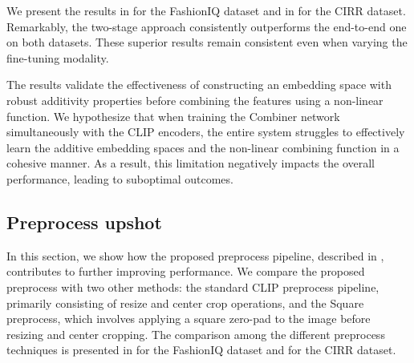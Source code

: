 \documentclass[acmlarge]{acmart}
\begin{document}
We present the results in  for the FashionIQ dataset and in  for the CIRR dataset. Remarkably, the two-stage approach consistently outperforms the end-to-end one on both datasets. These superior results remain consistent even when varying the fine-tuning modality.

The results validate the effectiveness of constructing an embedding space with robust additivity properties before combining the features using a non-linear function. We hypothesize that when training the Combiner network simultaneously with the CLIP encoders, the entire system struggles to effectively learn the additive embedding spaces and the non-linear combining function in a cohesive manner. As a result, this limitation negatively impacts the overall performance, leading to suboptimal outcomes.



\subsection{Preprocess upshot}


In this section, we show how the proposed preprocess pipeline, described in , contributes to further improving performance. We compare the proposed preprocess with two other methods: the standard CLIP preprocess pipeline, primarily consisting of resize and center crop operations, and the Square preprocess, which involves applying a square zero-pad to the image before resizing and center cropping.
The comparison among the different preprocess techniques is presented in  for the FashionIQ dataset and  for the CIRR dataset.
\end{document}
